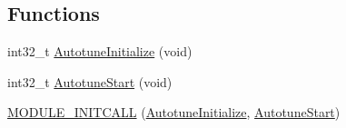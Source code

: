 \subsection*{\-Functions}
\begin{DoxyCompactItemize}
\item 
int32\-\_\-t \hyperlink{group___autotuning_module_gadcd235231767c9940ae6782d9ad75892}{\-Autotune\-Initialize} (void)
\item 
int32\-\_\-t \hyperlink{group___autotuning_module_ga4a975e6b1043a32ec5c88aaf7a9bc298}{\-Autotune\-Start} (void)
\item 
\hyperlink{group___autotuning_module_ga0000305457b75fc2aea4726d0e845bb0}{\-M\-O\-D\-U\-L\-E\-\_\-\-I\-N\-I\-T\-C\-A\-L\-L} (\hyperlink{group___autotuning_module_gadcd235231767c9940ae6782d9ad75892}{\-Autotune\-Initialize}, \hyperlink{group___autotuning_module_ga4a975e6b1043a32ec5c88aaf7a9bc298}{\-Autotune\-Start})
\end{DoxyCompactItemize}


